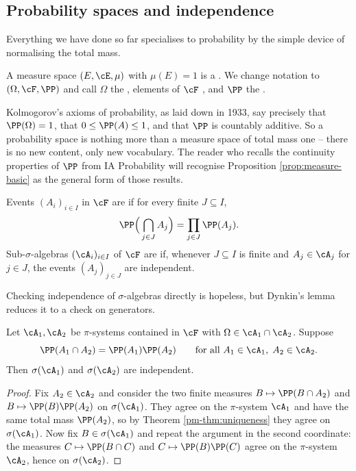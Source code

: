 \subsection{Probability spaces and independence}

Everything we have done so far specialises to probability by the simple device of normalising the total mass.

\begin{definition}
	A measure space $(E, \cE, \mu)$ with $\mu(E) = 1$ is a . We change notation to $(\Omega, \cF, \PP)$ and call $\Omega$ the , elements of $\cF$ , and $\PP$ the .
\end{definition}

Kolmogorov's axioms of probability, as laid down in 1933, say precisely that $\PP(\Omega)=1$, that $0 \leq \PP(A) \leq 1$, and that $\PP$ is countably additive. So a probability space is nothing more than a measure space of total mass one -- there is no new content, only new vocabulary. The reader who recalls the continuity properties of $\PP$ from IA Probability will recognise Proposition \ref{prop:measure-basic} as the general form of those results.

\begin{definition}[Independence]
	Events $(A_i)_{i \in I}$ in $\cF$ are  if for every finite $J \subseteq I$,
	$$
	\PP\Big( \bigcap_{j\in J} A_j \Big) = \prod_{j \in J} \PP(A_j).
	$$
	Sub-$\sigma$-algebras $(\cA_i)_{i \in I}$ of $\cF$ are  if, whenever $J \subseteq I$ is finite and $A_j \in \cA_j$ for $j \in J$, the events $(A_j)_{j \in J}$ are independent.
\end{definition}

Checking independence of $\sigma$-algebras directly is hopeless, but Dynkin's lemma reduces it to a check on generators.

\begin{proposition}\label{prop:indep-pi}
	Let $\cA_1, \cA_2$ be $\pi$-systems contained in $\cF$ with $\Omega \in \cA_1 \cap \cA_2$. Suppose
	$$
	\PP(A_1 \cap A_2) = \PP(A_1)\PP(A_2) \qquad \text{for all } A_1 \in \cA_1, \; A_2 \in \cA_2.
	$$
	Then $\sigma(\cA_1)$ and $\sigma(\cA_2)$ are independent.
\end{proposition}
\begin{proof}
	Fix $A_2 \in \cA_2$ and consider the two finite measures $B \mapsto \PP(B \cap A_2)$ and $B \mapsto \PP(B)\PP(A_2)$ on $\sigma(\cA_1)$. They agree on the $\pi$-system $\cA_1$ and have the same total mass $\PP(A_2)$, so by Theorem \ref{pm-thm:uniqueness} they agree on $\sigma(\cA_1)$. Now fix $B \in \sigma(\cA_1)$ and repeat the argument in the second coordinate: the measures $C \mapsto \PP(B \cap C)$ and $C \mapsto \PP(B)\PP(C)$ agree on the $\pi$-system $\cA_2$, hence on $\sigma(\cA_2)$.
\end{proof}

